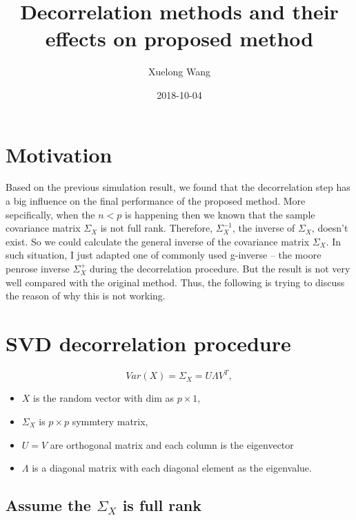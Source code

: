 \documentclass[]{article}
\title{Decorrelation methods and their effects on proposed method}
\author{Xuelong Wang}
\date{2018-10-04}
\providecommand{\tightlist}{%
  \setlength{\itemsep}{0pt}\setlength{\parskip}{0pt}}
\begin{document}
\maketitle

{
\setcounter{tocdepth}{2}
\tableofcontents
}
\section{Motivation}\label{motivation}

Based on the previous simulation result, we found that the decorrelation
step has a big influence on the final performance of the proposed
method. More sepcifically, when the \(n<p\) is happening then we known
that the sample covariance matrix \(\Sigma_{X}\) is not full rank.
Therefore, \(\Sigma^{-1}_X\), the inverse of \(\Sigma_{X}\), doesn't
exist. So we could calculate the general inverse of the covariance
matrix \(\Sigma_{X}\). In such situation, I just adapted one of commonly
used g-inverse -- the moore penrose inverse \(\Sigma^{+}_X\) during the
decorrelation procedure. But the result is not very well compared with
the original method. Thus, the following is trying to discuss the reason
of why this is not working.

\section{SVD decorrelation procedure}\label{svd-decorrelation-procedure}

\[
  Var(X) = \Sigma_X = U\Lambda V^T,
\]

\begin{itemize}
\tightlist
\item
  \(X\) is the random vector with dim as \(p \times 1\),\\
\item
  \(\Sigma_X\) is \(p \times p\) symmtery matrix,\\
\item
  \(U = V\) are orthogonal matrix and each column is the eigenvector\\
\item
  \(\Lambda\) is a diagonal matrix with each diagonal element as the
  eigenvalue.
\end{itemize}

\subsection{\texorpdfstring{Assume the \(\Sigma_X\) is full
rank}{Assume the \textbackslash{}Sigma\_X is full rank}}\label{assume-the-sigma_x-is-full-rank}
\end{document}
